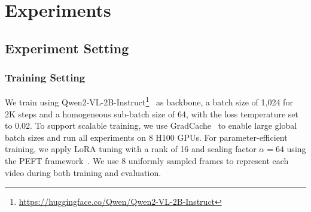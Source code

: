 \section{Experiments}
\subsection{Experiment Setting}




\subsubsection{Training Setting}
We train \model using Qwen2-VL-2B-Instruct\footnote{\url{https://huggingface.co/Qwen/Qwen2-VL-2B-Instruct}}~\citep{qwen2vl} as backbone, a batch size of 1,024 for 2K steps and a homogeneous sub-batch size of 64, with the loss temperature set to 0.02. To support scalable training, we use GradCache~\citep{gradcache} to enable large global batch sizes and run all experiments on 8 H100 GPUs. For parameter-efficient training, we apply LoRA tuning with a rank of 16 and scaling factor $\alpha=64$ using the PEFT framework~\citep{peft}. We use 8 uniformly sampled frames to represent each video during both training and evaluation. 

